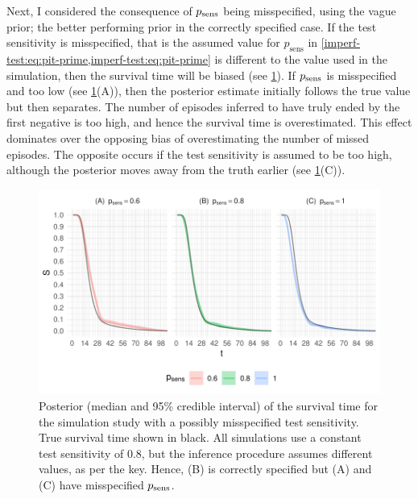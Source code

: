 \documentclass[thesis.tex]{subfiles}
\begin{document}
Next, I considered the consequence of $p_\text{sens}$ being misspecified, using the vague prior; the better performing prior in the correctly specified case.
If the test sensitivity is misspecified, that is the assumed value for $p_\text{sens}$ in \cref{imperf-test:eq:pit-prime,imperf-test:eq:pit-prime} is different to the value used in the simulation, then the survival time will be biased (see \cref{imperf-test:fig:misspecified-test-sensitivity}).
If $p_\text{sens}$ is misspecified and too low (see \cref{imperf-test:fig:misspecified-test-sensitivity}(A)), then the posterior estimate initially follows the true value but then separates.
The number of episodes inferred to have truly ended by the first negative is too high, and hence the survival time is overestimated.
This effect dominates over the opposing bias of overestimating the number of missed episodes.
The opposite occurs if the test sensitivity is assumed to be too high, although the posterior moves away from the truth earlier (see \cref{imperf-test:fig:misspecified-test-sensitivity}(C)).
\begin{figure}
    \includegraphics[width=\textwidth]{cis-imperfect-testing/sim-misspecified-sensitivity}
  \caption[Simulation study results with misspecified test sensitivity]{%
    Posterior (median and 95\% credible interval) of the survival time for the simulation study with a possibly misspecified test sensitivity.
    True survival time shown in black.
    All simulations use a constant test sensitivity of 0.8, but the inference procedure assumes different values, as per the key.
    Hence, (B) is correctly specified but (A) and (C) have misspecified $p_\text{sens}$.
  }
  \label{imperf-test:fig:misspecified-test-sensitivity}
\end{figure}
\end{document}
